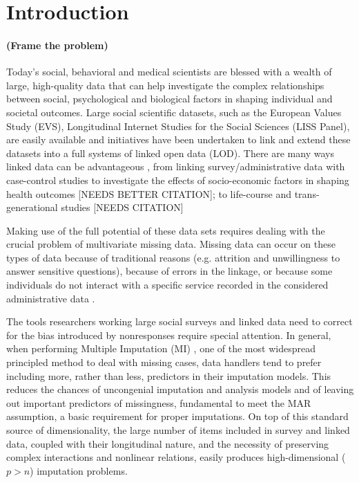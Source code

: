 \section{Introduction}

\paragraph{(Frame the problem)}

Today’s social, behavioral and medical scientists are blessed with a wealth of large, high-quality data that
can help investigate the complex relationships between social, psychological and biological factors in 
shaping individual and societal outcomes.
Large social scientific datasets, such as the European Values Study (EVS), Longitudinal Internet Studies for the 
Social Sciences (LISS Panel), are easily available and initiatives have been undertaken to link and extend these 
datasets into a full systems of linked open data (LOD).
There are many ways linked data can be advantageous \citep{jutteEtAl:2011}, from linking survey/administrative data with
case-control studies to investigate the effects of socio-economic factors in shaping health outcomes
\citep{kozyrskyjEtAl:2009} [NEEDS BETTER CITATION]; to life-course and trans-generational studies [NEEDS CITATION]

Making use of the full potential of these data sets requires dealing with the crucial problem of multivariate
missing data.
Missing data can occur on these types of data because of traditional reasons (e.g. attrition and unwillingness
to answer sensitive questions), because of errors in the linkage, or because some individuals do not interact
with a specific service recorded in the considered administrative data \citep{harronEtAl:2017}.

The tools researchers working large social surveys and linked data need to correct for the bias introduced by nonresponses 
require special attention.
In general, when performing Multiple Imputation (MI) \citep{rubin:1987}, one of the most widespread principled method to deal 
with missing cases, data handlers tend to prefer including more, rather than less, predictors in their imputation models.
This reduces the chances of uncongenial imputation and analysis models \citep{meng:1994} and of leaving out important 
predictors of missingness, fundamental to meet the MAR assumption, a basic requirement for proper imputations.
On top of this standard source of dimensionality, the large number of items included in survey and linked data, coupled 
with their longitudinal nature, and the necessity of preserving complex interactions and nonlinear relations, easily 
produces high-dimensional ($p>n$) imputation problems.

